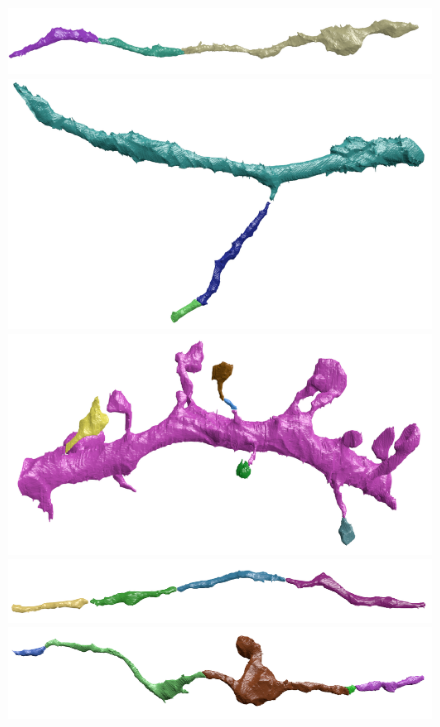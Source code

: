 \begin{figure}[t]
	\begin{minipage}{0.45\linewidth}
		\centering
		\includegraphics[width=0.85\linewidth]{./figures/VI-results/multicut-correct1.png}
		\includegraphics[width=0.85\linewidth]{./figures/VI-results/multicut-correct2.png}
		\includegraphics[width=0.85\linewidth]{./figures/VI-results/multicut-correct3.png}
		\includegraphics[width=0.85\linewidth]{./figures/VI-results/multicut-correct4.png}
		\includegraphics[width=0.85\linewidth]{./figures/VI-results/multicut-correct5.png}
	\end{minipage}

\end{figure}
